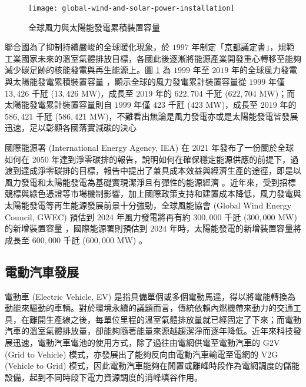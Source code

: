 \begin{figure}[htbp]
  \centering
  \texttt{[image: global-wind-and-solar-power-installation]}
  \caption[全球風力與太陽能發電累積裝置容量]{全球風力與太陽能發電累積裝置容量 \cite{owid2020renewable}}
  \label{figure: Global Wind and Solar Power Installation}
\end{figure}

聯合國為了抑制持續嚴峻的全球暖化現象，於 $1997$ 年制定「\uline{京都}議定書」，規範工業國家未來的溫室氣體排放目標，各國此後逐漸將能源產業開發重心轉移至能夠減少碳足跡的核能發電與再生能源上。圖 \ref{figure: Global Wind and Solar Power Installation} 為 $1999$ 年至 $2019$ 年的全球風力發電與太陽能發電累積裝置容量 \cite{owid2020renewable}，顯示全球的風力發電累計裝置容量從 $1999$ 年僅 $13,426$ 千瓩 ($13,426$ \si{\MW})，成長至 $2019$ 年的 $622,704$ 千瓩 ($622,704$ \si{\MW})；而太陽能發電累計裝置容量則自 $1999$ 年僅 423 千瓩 ($423$ \si{\MW})，成長至 $2019$ 年的 $586,421$ 千瓩 ($586,421$ \si{\MW})，不難看出無論是風力發電亦或是太陽能發電皆發展迅速，足以彰顯各國落實減碳的決心

國際能源署 (International Energy Agency, IEA) 在 2021 年發布了一份關於全球如何在 2050 年達到淨零碳排的報告，說明如何在確保穩定能源供應的前提下，過渡到達成淨零碳排的目標，報告中提出了兼具成本效益與經濟生產的途徑，即是以風力發電和太陽能發電為基礎實現潔淨且有彈性的能源經濟 \cite{iea2021net}。近年來，受到招標競標與綠色憑證等市場機制影響，加上國際政策支持和建置成本降低，風力發電與太陽能發電等再生能源發展前景十分強勁，全球風能協會 (Global Wind Energy Council, GWEC) 預估到 $2024$ 年風力發電將再有約 $300,000$ 千瓩 ($300,000$ \si{\MW}) 的新增裝置容量 \cite{ohlenforst2019global}，國際能源署則預估到 $2024$ 年時，太陽能發電的新增裝置容量將成長至 $600,000$ 千瓩 ($600,000$ \si{\MW}) \cite{iea2019report}。

\subsection{電動汽車發展}

電動車 (Electric Vehicle, EV) 是指具備單個或多個電動馬達，得以將電能轉換為動能來驅動的車輛。對於環境永續的議題而言，傳統依賴內燃機帶來動力的交通工具，在離開生產線之後，每單位里程的溫室氣體排放量就已經固定了下來；而電動汽車的溫室氣體排放量，卻能夠隨著能量來源越趨潔淨而逐年降低。近年來科技發展迅速，電動汽車電池的使用方式，除了過往由電網供電至電動汽車的 G2V (Grid to Vehicle) 模式，亦發展出了能夠反向由電動汽車輸電至電網的 V2G (Vehicle to Grid) 模式，因此電動汽車能夠在閒置或離峰時段作為電網調度的儲能設備，起到不同時段下電力資源調度的消峰填谷作用。

